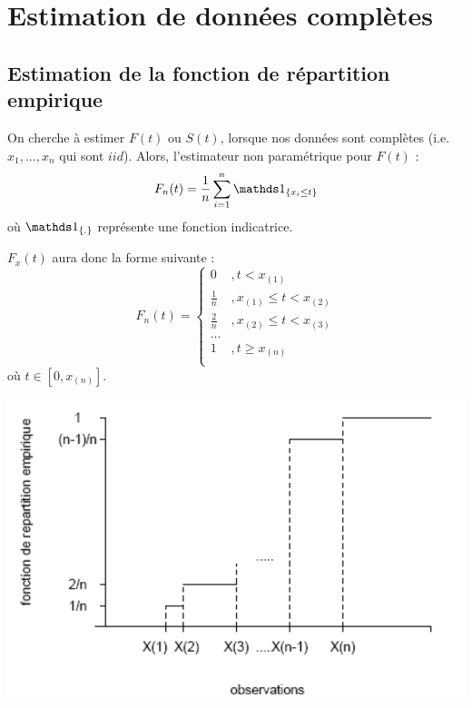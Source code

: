 \documentclass[12pt, french]{report}
\begin{document}
\section{Estimation de données complètes}
\subsection{Estimation de la fonction de répartition empirique}
On cherche à estimer $F(t)$ ou $S(t)$, lorsque nos données sont complètes (i.e. $x_1, ..., x_n$ qui sont $iid$). Alors, l'estimateur non paramétrique pour $F(t)$ : 
\begin{equation}
F_n(t)	 = \frac{1}{n} \sum_{i=1}^{n} \indic{x_i \leq t}
\end{equation}
où $\indic{.}$ représente une fonction indicatrice.

$F_x(t)$ aura donc la forme suivante : 
\begin{equation}
F_n(t) =
\begin{cases}
0				& , t < x_{(1)} \\
\frac{1}{n}		& , x_{(1)} \leq t < x_{(2)} \\
\frac{2}{n}		& , x_{(2)} \leq t < x_{(3)} \\
...				& \\
1				& , t \geq x_{(n)} \\
\end{cases}
\end{equation}
où $t \in [0, x_{(n)}]$.

\begin{center}
\includegraphics[scale=0.3]{Figures/Fct_de_repartition_empirique}
\end{center}
\end{document}
